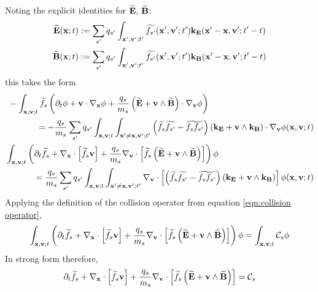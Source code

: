    Noting the explicit identities for $\widetilde{\mathbf{E}}$, $\widetilde{\mathbf{B}}$:
    \begin{align}
        \widetilde{\mathbf{E}}(\mathbf{x}; t)  &:=  \sum_{s'}q_{s'}\int_{\mathbf{x}', \mathbf{v}'; t'}\widetilde{f_{s'}}(\mathbf{x}', \mathbf{v}'; t')\mathbf{k}_{\mathbf{E}}(\mathbf{x}' - \mathbf{x}, \mathbf{v}'; t' - t)  \\
        \widetilde{\mathbf{B}}(\mathbf{x}; t)  &:=  \sum_{s'}q_{s'}\int_{\mathbf{x}', \mathbf{v}'; t'}\widetilde{f_{s'}}(\mathbf{x}', \mathbf{v}'; t')\mathbf{k}_{\mathbf{B}}(\mathbf{x}' - \mathbf{x}, \mathbf{v}'; t' - t)
    \end{align}
    this takes the form
    \begin{align}
        \begin{split}
            &- \int_{\mathbf{x}, \mathbf{v}; t}\widetilde{f_{s}}\left(\partial_{t}\phi + \mathbf{v}\cdot\nabla_{\mathbf{x}}\phi + \frac{q_{s}}{m_{s}}\left(\widetilde{\mathbf{E}} + \mathbf{v}\wedge\widetilde{\mathbf{B}}\right)\cdot\nabla_{\mathbf{v}}\phi\right)  \\
            &\;\;\;\;\;\;\;\;\;\;\;\;=  - \frac{q_{s}}{m_{s}}\sum_{s'}q_{s'}\int_{\mathbf{x}, \mathbf{v}; t}\int_{\mathbf{x}' \neq \mathbf{x}, \mathbf{v}'; t'}\left(\widetilde{f_{s}}\widetilde{f_{s'}} - \widetilde{f_{s}f_{s'}}\right)(\mathbf{k}_{\mathbf{E}}  + \mathbf{v}\wedge\mathbf{k}_{\mathbf{B}})\cdot\nabla_{\mathbf{v}}\phi(\mathbf{x}, \mathbf{v}; t)
        \end{split}  \\
        \begin{split}
          &\int_{\mathbf{x}, \mathbf{v}; t}\left(\partial_{t}\widetilde{f_{s}} + \nabla_{\mathbf{x}}\cdot\left[\widetilde{f_{s}}\mathbf{v}\right] + \frac{q_{s}}{m_{s}}\nabla_{\mathbf{v}}\cdot\left[\widetilde{f_{s}}\left(\widetilde{\mathbf{E}} + \mathbf{v}\wedge\widetilde{\mathbf{B}}\right)\right]\right)\phi  \\
          &\;\;\;\;\;\;\;\;\;\;\;\;=  \frac{q_{s}}{m_{s}}\sum_{s'}q_{s'}\int_{\mathbf{x}, \mathbf{v}; t}\int_{\mathbf{x}' \neq \mathbf{x}, \mathbf{v}'; t'}\nabla_{\mathbf{v}}\cdot\left[\left(\widetilde{f_{s}}\widetilde{f_{s'}} - \widetilde{f_{s}f_{s'}}\right)(\mathbf{k}_{\mathbf{E}}  + \mathbf{v}\wedge\mathbf{k}_{\mathbf{B}})\right]\phi(\mathbf{x}, \mathbf{v}; t)
        \end{split}
    \end{align}
    Applying the definition of the collision operator from equation \ref{eqn:collision operator},
    \begin{equation}
        \int_{\mathbf{x}, \mathbf{v}; t}\left(\partial_{t}\widetilde{f_{s}} + \nabla_{\mathbf{x}}\cdot\left[\widetilde{f_{s}}\mathbf{v}\right] + \frac{q_{s}}{m_{s}}\nabla_{\mathbf{v}}\cdot\left[\widetilde{f_{s}}\left(\widetilde{\mathbf{E}} + \mathbf{v}\wedge\widetilde{\mathbf{B}}\right)\right]\right)\phi  =  \int_{\mathbf{x}, \mathbf{v}; t}\mathcal{C}_{s}\phi
    \end{equation}
    In strong form therefore,
    \begin{equation}
        \partial_{t}\widetilde{f_{s}} + \nabla_{\mathbf{x}}\cdot\left[\widetilde{f_{s}}\mathbf{v}\right] + \frac{q_{s}}{m_{s}}\nabla_{\mathbf{v}}\cdot\left[\widetilde{f_{s}}\left(\widetilde{\mathbf{E}} + \mathbf{v}\wedge\widetilde{\mathbf{B}}\right)\right]  =  \mathcal{C}_{s}
    \end{equation}

    